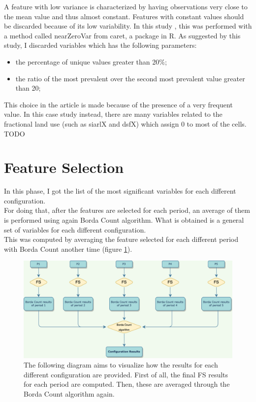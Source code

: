 A feature with low variance is characterized by having observations very close to the mean value and thus almost constant.
Features with constant values should be discarded because of its low variability.
In this study \cite{kuhn2008building}, this was performed with a method called  nearZeroVar from \gls{caret}, a package in R.
As suggested by this study, I discarded variables which has the following parameters: 
\begin{itemize}
    \item the percentage of unique values greater than 20\%;
    \item the ratio of the most prevalent over the second most prevalent value greater than 20;
\end{itemize} 
This choice in the article is made because of the presence of a very frequent value. In this case study instead, there are many variables related to the fractional land use (such as siarlX and dsfX) which assign 0 to most of the cells. TODO

\pagebreak
\section{Feature Selection}
In this phase, I got the list of the most significant variables for each different configuration.\\
For doing that, after the features are selected for each period, an average of them is performed using again Borda Count algorithm. What is obtained is a general set of variables for each different configuration.\\
This was computed by averaging the feature selected for each different period with Borda Count another time (figure \ref{fig:overview_configuration}).\\
\bigbreak
\begin{figure}[H]
    \centering
    \includegraphics[width=.9\textwidth]{images/overview_results_configuration.png}
    \caption{The following diagram aims to visualize how the results for each different configuration are provided. First of all,  the final FS results for each period are computed. Then, these are averaged through the Borda Count algorithm again.}
    \label{fig:overview_configuration}
\end{figure}


